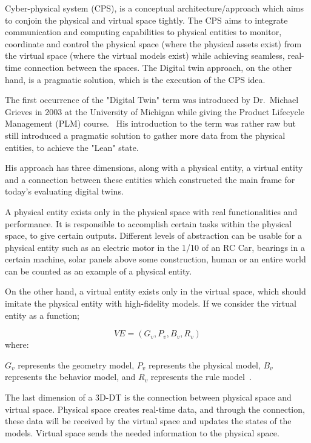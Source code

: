 \documentclass[9pt,conference]{IEEEtran}
\begin{document}
    Cyber-physical system (CPS), is a conceptual architecture/approach which aims to conjoin the physical and virtual space tightly. 
    The CPS aims to integrate communication and computing capabilities to physical entities to monitor, coordinate and control the physical space (where the physical assets exist) from the virtual space (where the virtual models exist) while achieving seamless, real-time connection between the spaces.
    The Digital twin approach, on the other hand, is a pragmatic solution, which is the execution of the CPS idea.~\cite{TAOCHAPTER1}
    
    The first occurrence of the "Digital Twin" term was introduced by Dr.~Michael Grieves in 2003 at the University of Michigan while giving the Product Lifecycle Management (PLM) course.~\cite{DTGRIEVES}
    His introduction to the term was rather raw but still introduced a pragmatic solution to gather more data from the physical entities, to achieve the "Lean" state.
    
    His approach has three dimensions, along with a physical entity, a virtual entity and a connection between these entities which constructed the main frame for today's evaluating digital twins.~\cite{DTGRIEVES}

    A physical entity exists only in the physical space with real functionalities and performance. It is responsible to accomplish certain tasks within the physical space, to give certain outputs.
    Different levels of abstraction can be usable for a physical entity such as an electric motor in the 1/10 of an RC Car, bearings in a certain machine, solar panels above some construction, human or an entire world can be counted as an example of a physical entity.

    On the other hand, a virtual entity exists only in the virtual space, which should imitate the physical entity with high-fidelity models. If we consider the virtual entity as a function;

    \begin{equation}\label{Formulated Entity Equation}
        VE = (G_v, P_v, B_v, R_v)
    \end{equation}
    where:
    
    $G_v$ represents the geometry model, $P_v$ represents the physical model, $B_v$ represents  the behavior model, and $R_v$ represents the rule model~\cite{DTGRIEVES}.
    
    The last dimension of a 3D-DT is the connection between physical space and virtual space. Physical space creates real-time data, and through the connection, these data will be received by the virtual space 
    and updates the states of the models. Virtual space sends the needed information to the physical space.  
\end{document}
